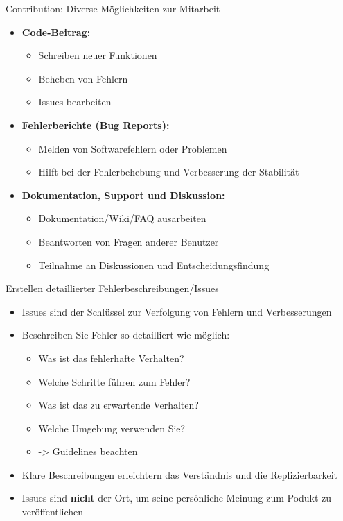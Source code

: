 \documentclass[compress,aspectratio=169]{beamer}
\begin{document}
	\begin{frame}{Contribution: Diverse Möglichkeiten zur Mitarbeit}
		\begin{itemize}
			\item \textbf{Code-Beitrag:}
				\begin{itemize}
					\item Schreiben neuer Funktionen
					\item Beheben von Fehlern
					\item Issues bearbeiten
				\end{itemize}
			\item \textbf{Fehlerberichte (Bug Reports):}
				\begin{itemize}
					\item Melden von Softwarefehlern oder Problemen
					\item Hilft bei der Fehlerbehebung und Verbesserung der Stabilität
				\end{itemize}
			\item \textbf{Dokumentation, Support und Diskussion:}
				\begin{itemize}
					\item Dokumentation/Wiki/FAQ ausarbeiten
					\item Beantworten von Fragen anderer Benutzer
					\item Teilnahme an Diskussionen und Entscheidungsfindung
				\end{itemize}
		\end{itemize}
	\end{frame}

	\begin{frame}{Erstellen detaillierter Fehlerbeschreibungen/Issues}
		\begin{itemize}
			\item Issues sind der Schlüssel zur Verfolgung von Fehlern und Verbesserungen
			\item Beschreiben Sie Fehler so detailliert wie möglich:
			\begin{itemize}
				\item Was ist das fehlerhafte Verhalten?
				\item Welche Schritte führen zum Fehler?
				\item Was ist das zu erwartende Verhalten?
				\item Welche Umgebung verwenden Sie?
				\item -> Guidelines beachten
			\end{itemize}
			\item Klare Beschreibungen erleichtern das Verständnis und die Replizierbarkeit
			\vspace{2em}
			\item Issues sind \textbf{nicht} der Ort, um seine persönliche Meinung zum Podukt zu veröffentlichen
		\end{itemize}
	\end{frame}
\end{document}
